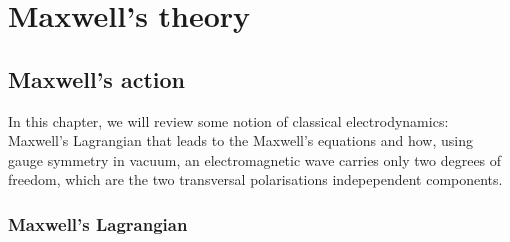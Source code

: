 \part{Maxwell's theory}

\chapter{Maxwell's action}

    In this chapter, we will review some notion of classical electrodynamics: Maxwell's Lagrangian that leads to the Maxwell's equations and how, using gauge symmetry in vacuum, an electromagnetic wave carries only two degrees of freedom, which are the two transversal polarisations indepependent components.

\section{Maxwell's Lagrangian}

